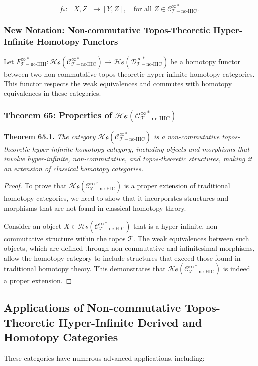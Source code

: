 \documentclass{article}
\begin{document}
\[
f_*: [X, Z] \to [Y, Z], \quad \text{for all } Z \in \mathcal{C}_{\mathcal{T}-\text{nc-HIC}}^{\infty *}.
\]

\subsubsection{New Notation: Non-commutative Topos-Theoretic Hyper-Infinite Homotopy Functors}
Let \(F_{\mathcal{T}-\text{nc-HIH}}^{\infty *}: \mathcal{Ho}(\mathcal{C}_{\mathcal{T}-\text{nc-HIC}}^{\infty *}) \to \mathcal{Ho}(\mathcal{D}_{\mathcal{T}-\text{nc-HIC}}^{\infty *})\) be a homotopy functor between two non-commutative topos-theoretic hyper-infinite homotopy categories. This functor respects the weak equivalences and commutes with homotopy equivalences in these categories.

\subsubsection{Theorem 65: Properties of \(\mathcal{Ho}(\mathcal{C}_{\mathcal{T}-\text{nc-HIC}}^{\infty *})\)}
\textbf{Theorem 65.1.} \textit{The category \(\mathcal{Ho}(\mathcal{C}_{\mathcal{T}-\text{nc-HIC}}^{\infty *})\) is a non-commutative topos-theoretic hyper-infinite homotopy category, including objects and morphisms that involve hyper-infinite, non-commutative, and topos-theoretic structures, making it an extension of classical homotopy categories.}

\begin{proof}
To prove that \(\mathcal{Ho}(\mathcal{C}_{\mathcal{T}-\text{nc-HIC}}^{\infty *})\) is a proper extension of traditional homotopy categories, we need to show that it incorporates structures and morphisms that are not found in classical homotopy theory.

Consider an object \(X \in \mathcal{Ho}(\mathcal{C}_{\mathcal{T}-\text{nc-HIC}}^{\infty *})\) that is a hyper-infinite, non-commutative structure within the topos \(\mathcal{T}\). The weak equivalences between such objects, which are defined through non-commutative and infinitesimal morphisms, allow the homotopy category to include structures that exceed those found in traditional homotopy theory. This demonstrates that \(\mathcal{Ho}(\mathcal{C}_{\mathcal{T}-\text{nc-HIC}}^{\infty *})\) is indeed a proper extension.
\end{proof}

\subsection{Applications of Non-commutative Topos-Theoretic Hyper-Infinite Derived and Homotopy Categories}
These categories have numerous advanced applications, including:
\end{document}
